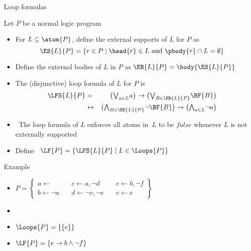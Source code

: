\begin{frame}{Loop formulas}

  Let $P$ be a normal logic program
  \begin{itemize}
  \item <1->
    For $L\subseteq\atom{P}$,
    define the \alert<1-2>{external supports} of $L$ for $P$ as
    \[
    \ES{L}{P}
    =
    \{  r\in P\mid\head{r}\in L\text{ and } \pbody{r}\cap L=\emptyset  \}
    \]
  \item<2-> Define the \alert{external bodies} of $L$ in $P$ as
    \(
    \EB{L}{P}=\body{\ES{L}{P}}
    \)
  \item<3->
    The (disjunctive) \alert{loop formula} of $L$ for $P$ is
    \begin{eqnarray*}
      \LFS{L}{P}
      & = &
      \big(
      \textstyle{\bigvee_{a\in L}} a
      \big)
      \rightarrow
      \big(
      \textstyle{\bigvee_{B\in\EB{L}{P}}}\BF{B}
      \big)
      \\
      & \leftrightarrow &
      \big(
      \textstyle{\bigwedge_{B\in\EB{L}{P}}}\neg \BF{B}
      \big)
      \rightarrow
      \big(
      \textstyle{\bigwedge_{a\in L}}\neg a
      \big)
    \end{eqnarray*}
  \item<4->  \
    The loop formula of $L$ enforces
    all atoms in~$L$ to be $\mathit{false}$
    whenever $L$ is not externally supported
  \item<4->
    Define \
    \(
    \LF{P} = \{  \LFS{L}{P} \mid L \in \Loops{P}  \}
    \)
  \end{itemize}
\end{frame}
\begin{frame}[c]{Example}
  \bigskip
  \begin{itemize}
  \item<1->
  \(
  P
  =
  \left\{
    \begin{array}{lll}
      a \leftarrow                  \quad &
      c \leftarrow a, \neg d       \quad &
      e \leftarrow b, \neg f
      \\
      b \leftarrow \neg a          \quad &
      d \leftarrow \neg c, \neg e \quad &
      e \leftarrow e
    \end{array}
  \right\}
  \)
  \bigskip
  \item<1-> []
    \begin{center}
    
    \end{center}
  \item<1-> $\Loops{P}=\{\{e\}\}$
  \item<2-> $\LF{P}=\{e\rightarrow b\wedge\neg f\}$
\end{itemize}
\end{frame}
